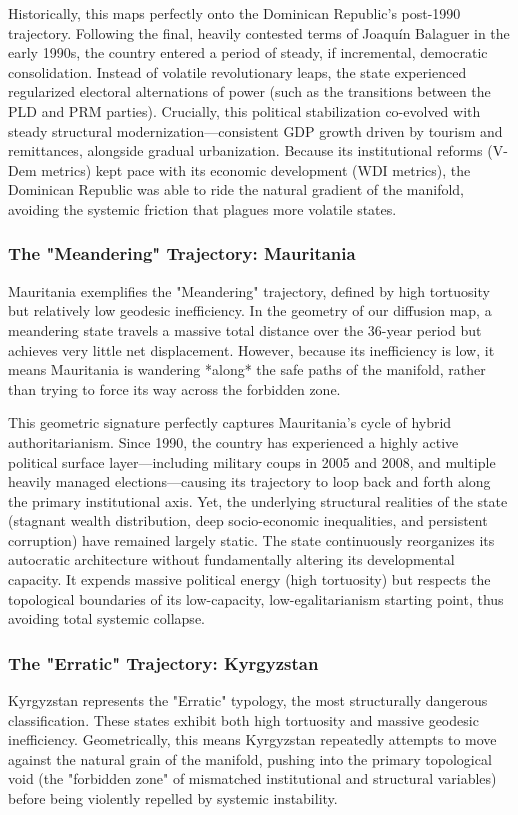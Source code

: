 \documentclass[12pt]{article}
\begin{document}
Historically, this maps perfectly onto the Dominican Republic’s post-1990 trajectory. Following the final, heavily contested terms of Joaquín Balaguer in the early 1990s, the country entered a period of steady, if incremental, democratic consolidation. Instead of volatile revolutionary leaps, the state experienced regularized electoral alternations of power (such as the transitions between the PLD and PRM parties). Crucially, this political stabilization co-evolved with steady structural modernization—consistent GDP growth driven by tourism and remittances, alongside gradual urbanization. Because its institutional reforms (V-Dem metrics) kept pace with its economic development (WDI metrics), the Dominican Republic was able to ride the natural gradient of the manifold, avoiding the systemic friction that plagues more volatile states.

\subsubsection{The "Meandering" Trajectory: Mauritania}
Mauritania exemplifies the "Meandering" trajectory, defined by high tortuosity but relatively low geodesic inefficiency. In the geometry of our diffusion map, a meandering state travels a massive total distance over the 36-year period but achieves very little net displacement. However, because its inefficiency is low, it means Mauritania is wandering *along* the safe paths of the manifold, rather than trying to force its way across the forbidden zone.

This geometric signature perfectly captures Mauritania's cycle of hybrid authoritarianism. Since 1990, the country has experienced a highly active political surface layer—including military coups in 2005 and 2008, and multiple heavily managed elections—causing its trajectory to loop back and forth along the primary institutional axis. Yet, the underlying structural realities of the state (stagnant wealth distribution, deep socio-economic inequalities, and persistent corruption) have remained largely static. The state continuously reorganizes its autocratic architecture without fundamentally altering its developmental capacity. It expends massive political energy (high tortuosity) but respects the topological boundaries of its low-capacity, low-egalitarianism starting point, thus avoiding total systemic collapse.

\subsubsection{The "Erratic" Trajectory: Kyrgyzstan}
Kyrgyzstan represents the "Erratic" typology, the most structurally dangerous classification. These states exhibit both high tortuosity and massive geodesic inefficiency. Geometrically, this means Kyrgyzstan repeatedly attempts to move against the natural grain of the manifold, pushing into the primary topological void (the "forbidden zone" of mismatched institutional and structural variables) before being violently repelled by systemic instability.
\end{document}
